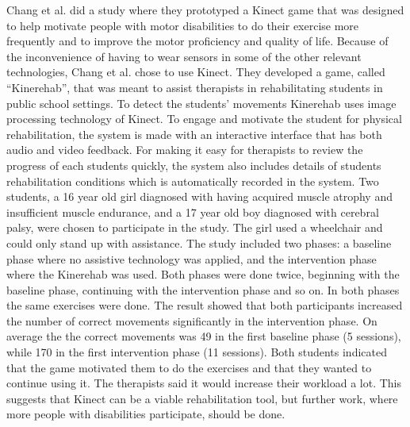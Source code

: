 Chang et al. did a study where they prototyped a Kinect game that was designed to help motivate people with motor disabilities to do their exercise more frequently and to improve the motor proficiency and quality of life. Because of the inconvenience of having to wear sensors in some of the other relevant technologies, Chang et al. chose to use Kinect. They developed a game, called “Kinerehab”, that was meant to assist therapists in rehabilitating students in public school settings. To detect the students’ movements Kinerehab uses image processing technology of Kinect. To engage and motivate the student for physical rehabilitation, the system is made with an interactive interface that has both audio and video feedback. For making it easy for therapists to review the progress of each students quickly, the system also includes details of students rehabilitation conditions which is automatically recorded in the system. Two students, a 16 year old girl diagnosed with having acquired muscle atrophy and insufficient muscle endurance, and a 17 year old boy diagnosed with cerebral palsy, were chosen to participate in the study. The girl used a wheelchair and could only stand up with assistance. The study included two phases: a baseline phase  where no assistive technology was applied, and the intervention phase where the Kinerehab was used. Both phases were done twice, beginning with the baseline phase, continuing with the intervention phase and so on. In both phases the same exercises were done. The result showed that both participants increased the number of correct movements significantly in the intervention phase. On average the the correct movements was 49 in the first baseline phase (5 sessions), while 170 in the first intervention phase (11 sessions). Both students indicated that the game motivated them to do the exercises and that they wanted to continue using it. The therapists said it would increase their workload a lot. This suggests that Kinect can be a viable rehabilitation tool, but further work, where more people with disabilities participate, should be done. \cite{kinect}





